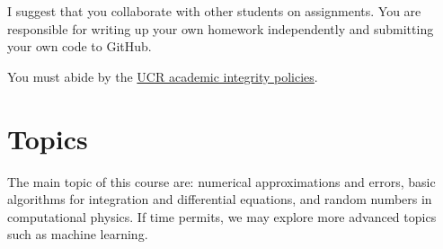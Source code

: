 \documentclass[12pt]{article}
\numberwithin{equation}{section}    %
\begin{document}
I suggest that you collaborate with other students on assignments. You are responsible for writing up your own homework independently and submitting your own code to GitHub.

\vspace{1em}
\noindent You must abide by the \href{http://conduct.ucr.edu/policies/academicintegrity.html}{UCR academic integrity policies}.


\section*{Topics}

The main topic of this course are: numerical approximations and errors, basic algorithms for integration and differential equations, and random numbers in computational physics. If time permits, we may explore more advanced topics such as machine learning.
\end{document}
